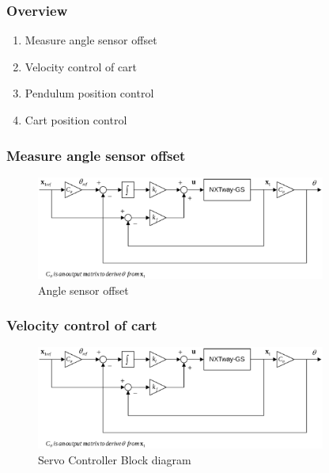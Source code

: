 \documentclass[aspectratio=169]{beamer}
\begin{document}

\begin{frame}
\frametitle{Overview}
\begin{enumerate}
\item Measure angle sensor offset
\item Velocity control of cart
\item Pendulum position control
\item Cart position control
\end{enumerate}
\end{frame}


\begin{frame}
\frametitle{Measure angle sensor offset}
\begin{figure}
    \includegraphics[width=0.85\textwidth]{CtrlBlk.eps}
	\caption{Angle sensor offset}
\end{figure}
\end{frame}


\begin{frame}
\frametitle{Velocity control of cart}

\begin{figure}
    \includegraphics[width=0.85\textwidth]{CtrlBlk.eps}
	\caption{Servo Controller Block diagram}
\end{figure}

\end{frame}

\end{document}
